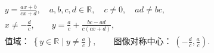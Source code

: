\[
\begin{gathered}
 y=\frac{ax+b}{cx+d},\quad a,b,c,d\in\mathbb R,\quad c\ne0,\quad ad\ne bc,\\
 x\ne-\frac dc,\qquad
 y=\frac ac+\frac{bc-ad}{c(cx+d)},\\
 \boxed{\text{值域：}\;\left\{y\in\mathbb R\mid y\ne\frac ac\right\}},\qquad
 \text{图像对称中心：}\;\left(-\frac dc,\frac ac\right).
\end{gathered}
\]
